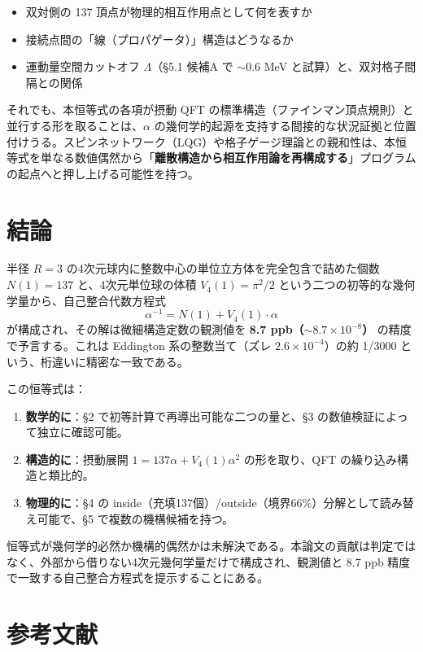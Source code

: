 \documentclass[a4paper,11pt]{ltjsarticle}
\begin{document}
\begin{itemize}
\item 双対側の 137 頂点が物理的相互作用点として何を表すか
\item 接続点間の「線（プロパゲータ）」構造はどうなるか
\item 運動量空間カットオフ $\Lambda$（§5.1 候補A で $\sim 0.6$ MeV と試算）と、双対格子間隔との関係
\end{itemize}

それでも、本恒等式の各項が摂動 QFT の標準構造（ファインマン頂点規則）と並行する形を取ることは、$\alpha$ の幾何学的起源を支持する間接的な状況証拠と位置付けうる。スピンネットワーク（LQG）や格子ゲージ理論との親和性は、本恒等式を単なる数値偶然から「\textbf{離散構造から相互作用論を再構成する}」プログラムの起点へと押し上げる可能性を持つ。

\section{結論}

半径 $R=3$ の4次元球内に整数中心の単位立方体を完全包含で詰めた個数 $N(1) = 137$ と、4次元単位球の体積 $V_4(1) = \pi^2/2$ という二つの初等的な幾何学量から、自己整合代数方程式
\[ \alpha^{-1} = N(1) + V_4(1) \cdot \alpha \]
が構成され、その解は微細構造定数の観測値を \textbf{8.7 ppb（$\sim 8.7 \times 10^{-8}$）} の精度で予言する。これは Eddington 系の整数当て（ズレ $2.6 \times 10^{-4}$）の約 1/3000 という、桁違いに精密な一致である。

この恒等式は：

\begin{enumerate}
\item \textbf{数学的に}：§2 で初等計算で再導出可能な二つの量と、§3 の数値検証によって独立に確認可能。
\item \textbf{構造的に}：摂動展開 $1 = 137\alpha + V_4(1)\alpha^2$ の形を取り、QFT の繰り込み構造と類比的。
\item \textbf{物理的に}：§4 の inside（充填137個）/outside（境界66\%）分解として読み替え可能で、§5 で複数の機構候補を持つ。
\end{enumerate}

恒等式が幾何学的必然か機構的偶然かは未解決である。本論文の貢献は判定ではなく、外部から借りない4次元幾何学量だけで構成され、観測値と 8.7 ppb 精度で一致する自己整合方程式を提示することにある。

\section*{参考文献}
\end{document}
